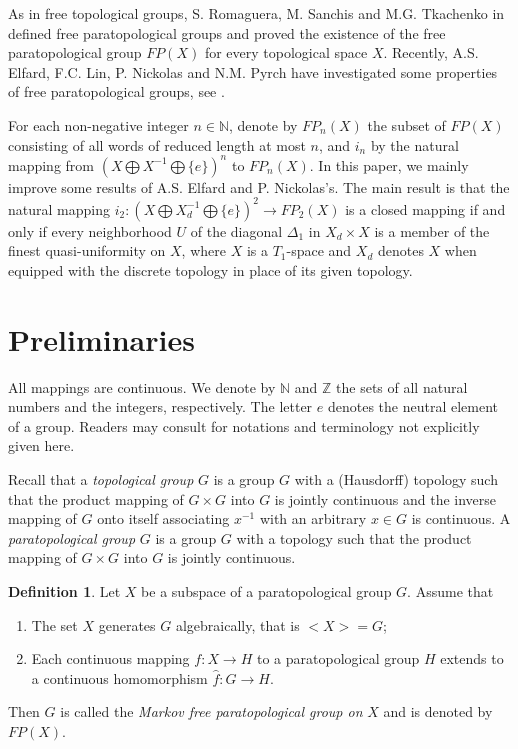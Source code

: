 \documentclass{amsart}
\theoremstyle{definition}
\newtheorem{definition}[theorem]{Definition}
\begin{document}
As in free topological groups, S. Romaguera, M. Sanchis and M.G. Tkachenko in \cite{RS} defined free paratopological groups and proved the existence of the free paratopological group $FP(X)$ for every topological space $X$. Recently, A.S. Elfard, F.C. Lin, P. Nickolas and N.M. Pyrch have investigated some properties of free paratopological groups, see \cite{EN2012, EN2013, LFC2012, LF, PN2006, PN2011}.

For each non-negative integer $n\in\mathbb{N}$, denote by $FP_{n}(X)$ the subset of $FP(X)$ consisting of all words of reduced length at most $n$, and $i_{n}$ by the natural mapping from $(X\bigoplus X^{-1}\bigoplus\{e\})^{n}$ to $FP_{n}(X)$. In this paper, we mainly improve some results of A.S. Elfard and P. Nickolas's. The main result is that the natural mapping $i_{2}: (X\bigoplus X_{d}^{-1}\bigoplus\{e\})^{2}\longrightarrow FP_{2}(X)$ is a closed mapping
if and only if every neighborhood $U$ of the diagonal $\Delta_{1}$ in $X_{d}\times X$ is a member of the finest quasi-uniformity on $X$,  where $X$ is a $T_{1}$-space and $X_{d}$ denotes $X$ when equipped with the discrete topology in place of its given topology.

\section{Preliminaries}
All mappings are continuous. We denote by $\mathbb{N}$ and $\mathbb{Z}$ the sets of all natural
numbers and the integers, respectively. The letter $e$
denotes the neutral element of a group. Readers may consult
\cite{AT2008, E1989, Gr1984, F1982} for notations and terminology not
explicitly given here.

Recall that a {\it topological group} $G$ is a group $G$ with a
(Hausdorff) topology such that the product mapping of $G \times G$ into
$G$ is jointly continuous and the inverse mapping of $G$ onto itself
associating $x^{-1}$ with an arbitrary $x\in G$ is continuous. A {\it
paratopological group} $G$ is a group $G$ with a topology such that
the product mapping of $G \times G$ into $G$ is jointly continuous.

\begin{definition}\cite{RS}
Let $X$ be a subspace of a paratopological group $G$. Assume that
\begin{enumerate}
\item The set $X$ generates $G$ algebraically, that is $<X>=G$;

\item  Each continuous mapping $f: X\rightarrow H$ to a paratopological group $H$ extends to a continuous homomorphism $\hat{f}: G\rightarrow H$.
\end{enumerate}
Then $G$ is called the {\it Markov free paratopological group on} $X$ and is denoted by $FP(X)$.
\end{definition}
\end{document}
